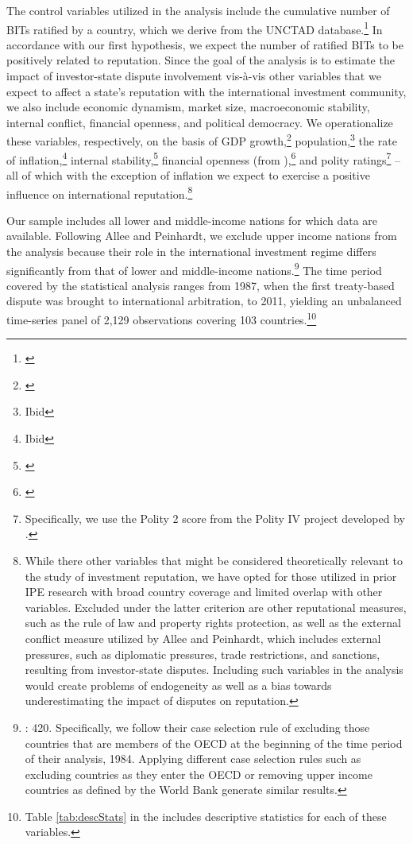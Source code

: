 \documentclass[12pt,onesided]{amsart}
\begin{document}
The control variables utilized in the analysis include the cumulative number of BITs ratified by a country, which we derive from the UNCTAD database.\footnote{\citet{unctad:2013c}} In accordance with our first hypothesis, we expect the number of ratified BITs to be positively related to reputation. Since the goal of the analysis is to estimate the impact of investor-state dispute involvement vis-\`{a}-vis other variables that we expect to affect a state's reputation with the international investment community, we also include economic dynamism, market size, macroeconomic stability, internal conflict, financial openness, and political democracy. We operationalize these variables, respectively, on the basis of GDP growth,\footnote{\citet{worldbank:2013}} population,\footnote{Ibid} the rate of inflation,\footnote{Ibid} internal stability,\footnote{\citet{prs:2013}} financial openness (from \citeauthor{chinn:ito:2008}),\footnote{\citet{chinn:ito:2008}} and polity ratings\footnote{Specifically, we use the Polity 2 score from the Polity IV project developed by \citet{marshall2013polity}.} -- all of which with the exception of inflation we expect to exercise a positive influence on international reputation.\footnote{While there other variables that might be considered theoretically relevant to the study of investment reputation, we have opted for those utilized in prior IPE research with broad country coverage and limited overlap with other variables. Excluded under the latter criterion are other reputational measures, such as the rule of law and property rights protection, as well as the external conflict measure utilized by Allee and Peinhardt, which includes external pressures, such as diplomatic pressures, trade restrictions, and sanctions, resulting from investor-state disputes. Including such variables in the analysis would create problems of endogeneity as well as a bias towards underestimating the impact of disputes on reputation.}

Our sample includes all lower and middle-income nations for which data are available. Following Allee and Peinhardt, we exclude upper income nations from the analysis because their role in the international investment regime differs significantly from that of lower and middle-income nations.\footnote{\citet{allee:peinhardt:2011}: 420. Specifically, we follow their case selection rule of excluding those countries that are members of the OECD at the beginning of the time period of their analysis, 1984. Applying different case selection rules such as excluding countries as they enter the OECD or removing upper income countries as defined by the World Bank generate similar results.} The time period covered by the statistical analysis ranges from 1987, when the first treaty-based dispute was brought to international arbitration, to 2011, yielding an unbalanced time-series panel of 2,129 observations covering 103 countries.\footnote{Table \ref{tab:descStats} in the  includes descriptive statistics for each of these variables.} 
\end{document}
